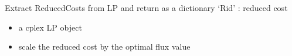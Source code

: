 \documentclass[letterpaper,10pt,english]{sphinxmanual}
\begin{document}
\begin{fulllineitems}
\label{\detokenize{modules_doc:cbmpy.CBCPLEX.cplx_getReducedCosts}}
\pysigstartsignatures
{}
\pysigstopsignatures
\sphinxAtStartPar
Extract ReducedCosts from LP and return as a dictionary ‘Rid’ : reduced cost
\begin{itemize}
\item {} 
\sphinxAtStartPar
{} a cplex LP object

\item {} 
\sphinxAtStartPar
{} scale the reduced cost by the optimal flux value

\end{itemize}

\end{fulllineitems}

\end{document}
